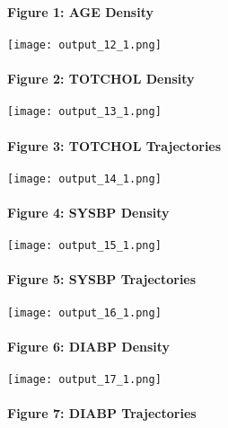 \documentclass[11pt]{article}
\makeatletter
\def\maxwidth{\ifdim\Gin@nat@width>\linewidth\linewidth
    \else\Gin@nat@width\fi}
\let\Oldincludegraphics\includegraphics
\renewcommand{\includegraphics}[1]{\Oldincludegraphics[width=.8\maxwidth]{#1}}
\makeatother
\begin{document}
    \hypertarget{figure-1-age-density}{%
\paragraph{Figure 1: AGE Density}\label{figure-1-age-density}}

    \texttt{[image: output\_12\_1.png]}

    \hypertarget{figure-2-totchol-density}{%
\paragraph{Figure 2: TOTCHOL Density}\label{figure-2-totchol-density}}

    \texttt{[image: output\_13\_1.png]}

    \hypertarget{figure-3-totchol-trajectories}{%
\paragraph{Figure 3: TOTCHOL
Trajectories}\label{figure-3-totchol-trajectories}}

    \texttt{[image: output\_14\_1.png]}

    \hypertarget{figure-4-sysbp-density}{%
\paragraph{Figure 4: SYSBP Density}\label{figure-4-sysbp-density}}

    \texttt{[image: output\_15\_1.png]}

    \hypertarget{figure-5-sysbp-trajectories}{%
\paragraph{Figure 5: SYSBP
Trajectories}\label{figure-5-sysbp-trajectories}}

    \texttt{[image: output\_16\_1.png]}

    \hypertarget{figure-6-diabp-density}{%
\paragraph{Figure 6: DIABP Density}\label{figure-6-diabp-density}}

    \texttt{[image: output\_17\_1.png]}

    \hypertarget{figure-7-diabp-trajectories}{%
\paragraph{Figure 7: DIABP
Trajectories}\label{figure-7-diabp-trajectories}}
\end{document}
